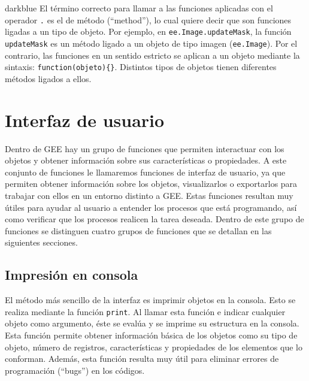 \documentclass[
  12pt,
  letterpaper,
  twoside]{book}
\begin{document}
\begin{bluebox2}

\begin{awesomeblock}{5pt}{\faLightbulb}{darkblue}
El término correcto para llamar a las funciones aplicadas con el operador \texttt{.} es el de método (``method''), lo cual quiere decir que son funciones ligadas a un tipo de objeto. Por ejemplo, en \texttt{ee.Image.updateMask}, la función \texttt{updateMask} es un método ligado a un objeto de tipo imagen (\texttt{ee.Image}). Por el contrario, las funciones en un sentido estricto se aplican a un objeto mediante la sintaxis: \texttt{function(objeto)\{\}}. Distintos tipos de objetos tienen diferentes métodos ligados a ellos.

\end{awesomeblock}

\end{bluebox2}

\newpage

\hypertarget{interfaz-de-usuario}{%
\chapter{Interfaz de usuario}\label{interfaz-de-usuario}}

Dentro de GEE hay un grupo de funciones que permiten interactuar con los objetos y obtener información sobre sus características o propiedades. A este conjunto de funciones le llamaremos funciones de interfaz de usuario, ya que permiten obtener información sobre los objetos, visualizarlos o exportarlos para trabajar con ellos en un entorno distinto a GEE. Estas funciones resultan muy útiles para ayudar al usuario a entender los procesos que está programando, así como verificar que los procesos realicen la tarea deseada. Dentro de este grupo de funciones se distinguen cuatro grupos de funciones que se detallan en las siguientes secciones.

\hypertarget{impresiuxf3n-en-consola}{%
\section{Impresión en consola}\label{impresiuxf3n-en-consola}}

El método más sencillo de la interfaz es imprimir objetos en la consola. Esto se realiza mediante la función \texttt{print}. Al llamar esta función e indicar cualquier objeto como argumento, éste se evalúa y se imprime su estructura en la consola. Esta función permite obtener información básica de los objetos como su tipo de objeto, número de registros, características y propiedades de los elementos que lo conforman. Además, esta función resulta muy útil para eliminar errores de programación (``bugs'') en los códigos.
\end{document}

